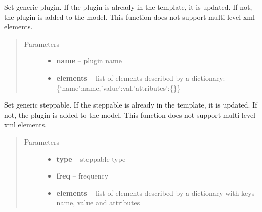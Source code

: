 \documentclass[letterpaper,10pt,english]{sphinxmanual}
\begin{document}
\begin{fulllineitems}
\begin{fulllineitems}
\label{Experiment:Experiment.Experiment.setGenericPlugin}
Set generic plugin. If the plugin is already in the template, it is updated. If not, the plugin is added to the model. This function does not support multi-level xml elements.
\begin{quote}\begin{description}
\item[{Parameters}] \leavevmode\begin{itemize}
\item {} 
\textbf{name} -- plugin name

\item {} 
\textbf{elements} -- list of elements described by a dictionary: \{`name':name,'value':val,'attributes':\{\}\}

\end{itemize}

\end{description}\end{quote}

\end{fulllineitems}


\begin{fulllineitems}
\label{Experiment:Experiment.Experiment.setGenericSteppable}
Set generic steppable. If the steppable is already in the template, it is updated. If not, the plugin is added to the model. This function does not support multi-level xml elements.
\begin{quote}\begin{description}
\item[{Parameters}] \leavevmode\begin{itemize}
\item {} 
\textbf{type} -- steppable type

\item {} 
\textbf{freq} -- frequency

\item {} 
\textbf{elements} -- list of elements described by a dictionary with keys name, value and attributes

\end{itemize}


\end{description}
\end{quote}
\end{fulllineitems}
\end{fulllineitems}
\end{document}
